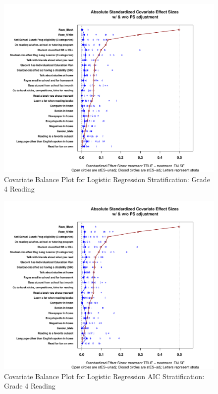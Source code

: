 \begin{figure}
\begin{center}
\includegraphics[width=\textwidth]{../Figures2009/g4read-lr-balance.pdf}
\caption{Covariate Balance Plot for Logistic Regression Stratification: Grade 4 Reading}
\end{center}
\end{figure}

\begin{figure}
\begin{center}
\includegraphics[width=\textwidth]{../Figures2009/g4read-lrAIC-balance.pdf}
\caption{Covariate Balance Plot for Logistic Regression AIC Stratification: Grade 4 Reading}
\end{center}
\end{figure}

